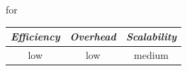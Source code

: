 
%
for
%

\begin{center}
\begin{tabular}{ccc}
\emph{Efficiency} & \emph{Overhead} & \emph{Scalability} \\
\hline
low &
low &
%
medium
\end{tabular}
\end{center}


